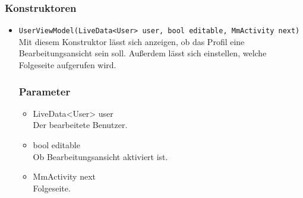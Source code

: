 \documentclass[a4paper]{scrreprt}
\begin{document}
\subsubsection*{Konstruktoren}
\begin{addmargin}[25pt]{0pt}
\begin{itemize}

\item \texttt{UserViewModel(LiveData<User> user, bool editable, MmActivity next)}\\
Mit diesem Konstruktor lässt sich anzeigen, ob das Profil eine Bearbeitungsansicht sein soll. Außerdem lässt sich einstellen, welche Folgeseite aufgerufen wird.

	\subsubsection*{Parameter}
	\begin{itemize}
	\item LiveData<User> user \\
		Der bearbeitete Benutzer.
	\item bool editable \\
		Ob Bearbeitungsansicht aktiviert ist.
	\item MmActivity next \\
		Folgeseite.
	\end{itemize}

\end{itemize}
\end{addmargin}
\end{document}
